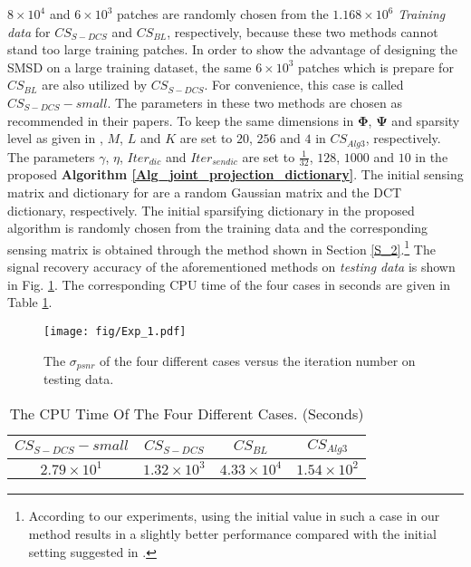\documentclass[final,5p,times,twocolumn]{elsarticle}
\begin{document}
$8\times10^4$ and $6\times10^3$ patches are randomly chosen from the $1.168\times10^6$ \emph{Training data} for $CS_{S-DCS}$ and $CS_{BL}$, respectively, because these two methods cannot stand too large training patches. In order to show the advantage of designing the SMSD on a large training dataset, the same $6\times 10^3$ patches which is prepare for $CS_{BL}$ are also utilized by $CS_{S-DCS}$. For convenience, this case is called $CS_{S-DCS}-small$. The parameters in these two methods are chosen as recommended in their papers. To keep the same dimensions in $\bm\Phi$, $\bm\Psi$ and sparsity level as given in \cite{BLLLJC15}, $M$, $L$ and $K$ are set to $20$, $256$ and $4$ in $CS_{Alg3}$, respectively. The parameters $\gamma$, $\eta$, $Iter_{dic}$ and $Iter_{sendic}$ are set to $\frac{1}{32}$, $128$, $1000$ and $10$ in the proposed {\bf Algorithm \ref{Alg_joint_projection_dictionary}}. The initial sensing matrix and dictionary for \cite{DCS09,BLLLJC15} are a random Gaussian matrix and the DCT dictionary, respectively. The initial sparsifying dictionary in the proposed algorithm is randomly chosen from the training data and the corresponding sensing matrix is obtained through the method shown in Section \ref{S_2}.\footnote{According to our experiments, using the initial value in such a case in our method results in a slightly better performance compared with the initial setting suggested in \cite{DCS09,BLLLJC15}.} The signal recovery accuracy of the aforementioned methods on \emph{testing data} is shown in Fig. \ref{f_1}. The corresponding CPU time of the four cases in seconds are given in Table \ref{t_1}.

\begin{figure}[!htb]
	
	\centering
	\texttt{[image: fig/Exp\_1.pdf]}\\
	\caption{The $\sigma_{psnr}$ of the four different cases versus the iteration number on testing data.}\label{f_1} %
\end{figure}



\begin{table}[!htb]
	\centering   \caption{The CPU Time Of The Four Different Cases. (Seconds)}\label{t_1}
	\begin{tabular}{|c|c|c|c|}\hline
		$CS_{S-DCS}-small$&$CS_{S-DCS}$&$CS_{BL}$&$CS_{Alg3}$\\\hline
		$2.79\times10^1$&$1.32\times10^3$&$4.33\times10^4$&$1.54\times10^2$\\\hline
	\end{tabular}
\end{table}
\end{document}
